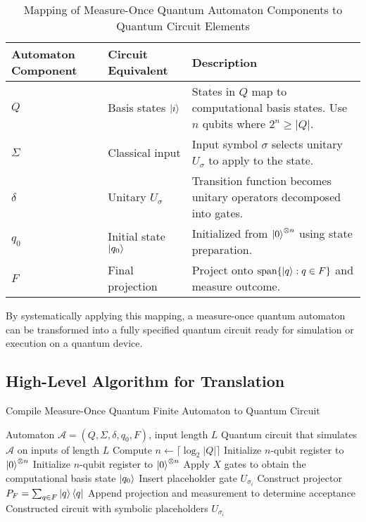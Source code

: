 \begin{table}[h]
    \centering
    \begin{tabularx}{\textwidth}{|l|l|X|}
    \hline
    \textbf{Automaton Component} & \textbf{Circuit Equivalent} & \textbf{Description} \\
    \hline
    $Q$ & Basis states $\ket{i}$ & States in $Q$ map to computational basis states. Use $n$ qubits where $2^n \geq |Q|$. \\
    \hline
    $\Sigma$ & Classical input & Input symbol $\sigma$ selects unitary $U_\sigma$ to apply to the state. \\
    \hline
    $\delta$ & Unitary $U_\sigma$ & Transition function becomes unitary operators decomposed into gates. \\
    \hline
    $q_0$ & Initial state $\ket{q_0}$ & Initialized from $\ket{0}^{\otimes n}$ using state preparation. \\
    \hline
    $F$ & Final projection & Project onto $\text{span}\{\ket{q} : q \in F\}$ and measure outcome. \\
    \hline
    \end{tabularx}
    \label{tab:automaton-to-circuit}
    \caption{Mapping of Measure-Once Quantum Automaton Components to Quantum Circuit Elements}
\end{table}

By systematically applying this mapping, a measure-once quantum automaton can be transformed into a fully specified quantum circuit ready for simulation or execution on a quantum device.

\subsection{High-Level Algorithm for Translation}
\begin{algorithm}[H]
    \caption{Compile Measure-Once Quantum Finite Automaton to Quantum Circuit}
    \label{alg:compile-mo-qfa}
    \begin{algorithmic}[1]
    \Require Automaton $\mathcal{A} = (Q, \Sigma, \delta, q_0, F)$, input length $L$
    \Ensure Quantum circuit that simulates $\mathcal{A}$ on inputs of length $L$
    \State Compute $n \gets \lceil \log_2 |Q| \rceil$
    \State Initialize $n$-qubit register to $\ket{0}^{\otimes n}$
    \State Initialize $n$-qubit register to $\ket{0}^{\otimes n}$
    \State Apply $X$ gates to obtain the computational basis state $\ket{q_0}$
        \State Insert placeholder gate $U_{\sigma_i}$
    \EndFor
    \State Construct projector $P_F = \sum_{q \in F} \ket{q}\bra{q}$
    \State Append projection and measurement to determine acceptance
    \State \Return Constructed circuit with symbolic placeholders $U_{\sigma_i}$
    \end{algorithmic}
\end{algorithm}

